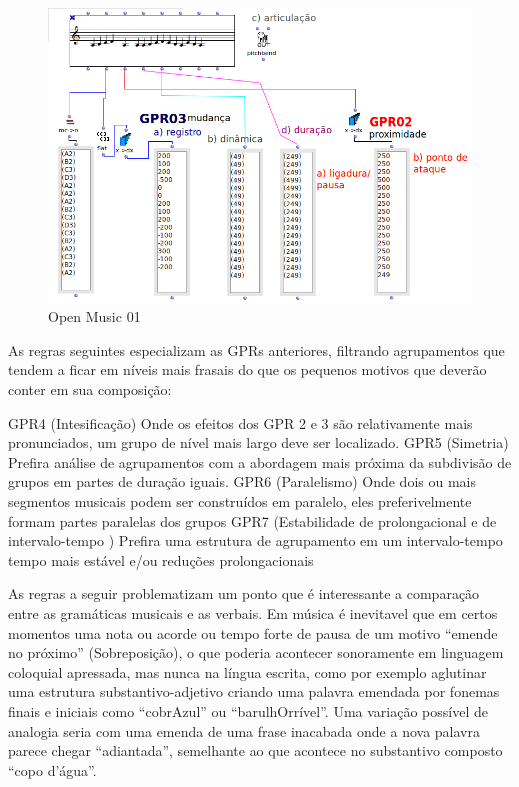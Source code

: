 \documentclass[
	12pt,				%
	openright,			%
	twoside,			%
	a4paper,			%
	english,			%
	french,				%
	spanish,			%
	brazil				%
	]{abntex2}
\begin{document}
\begin{figure}[htb]
	\caption{\label{fig_grafico}Open Music 01}
	\begin{center}
	    \includegraphics[scale=0.5]{mikro/OM_gttm_GPR02-03.png}
	\end{center}
\end{figure}






As regras seguintes especializam as GPRs anteriores, filtrando agrupamentos que tendem a ficar em níveis mais frasais do que os pequenos motivos que deverão conter em sua composição:

\begin{citacao}
GPR4 (Intesificação) Onde os efeitos dos GPR 2 e 3 são relativamente mais pronunciados, um grupo de nível mais largo deve ser localizado.\linebreak
GPR5 (Simetria) Prefira análise de agrupamentos com a abordagem mais próxima da subdivisão de grupos em partes de duração iguais.\linebreak
GPR6 (Paralelismo) Onde dois ou mais segmentos musicais podem ser construídos em paralelo, eles preferivelmente formam partes paralelas dos grupos\linebreak
GPR7 (Estabilidade de prolongacional e de intervalo-tempo ) Prefira uma estrutura de agrupamento em um intervalo-tempo tempo mais estável e/ou reduções prolongacionais
\cite[ pg.46-52]{lerdahl1983generative}
\end{citacao}

As regras a seguir problematizam um ponto que é interessante a comparação entre as gramáticas musicais e as verbais. Em música é inevitavel que em certos momentos uma nota ou acorde ou tempo forte de pausa de um motivo “emende no próximo” (Sobreposição), o que poderia acontecer sonoramente em linguagem coloquial apressada, mas nunca na língua escrita, como por exemplo aglutinar uma estrutura substantivo-adjetivo criando uma palavra emendada por fonemas finais e iniciais como “cobrAzul” ou “barulhOrrível”. Uma variação possível de analogia seria com uma emenda de uma frase inacabada onde a nova palavra parece chegar “adiantada”, semelhante ao que acontece no substantivo composto “copo d'água”. 
\end{document}
